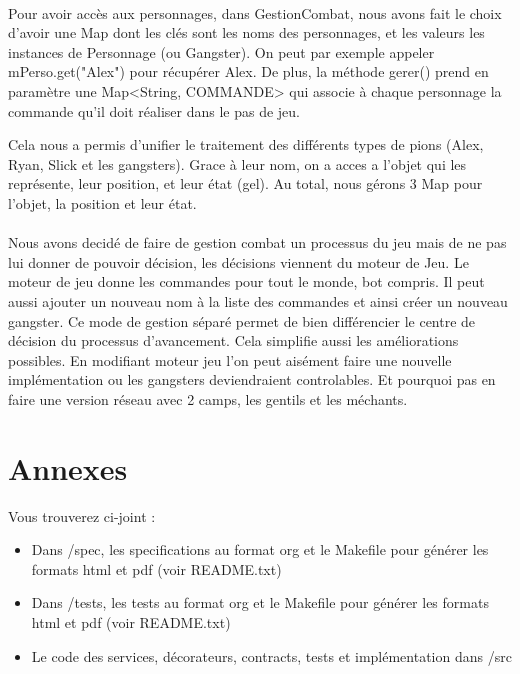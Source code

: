 \documentclass[a4paper,titlepage,openany,12pt]{report}
\begin{document}
\paragraph{}
Pour avoir accès aux personnages, dans GestionCombat, nous avons fait le choix d'avoir une Map dont les
clés sont les noms des personnages, et les valeurs les instances de Personnage (ou Gangster). On peut par 
exemple appeler mPerso.get("Alex") pour récupérer Alex.
De plus, la méthode gerer() prend en paramètre une Map<String, COMMANDE> qui associe à chaque personnage
la commande qu'il doit réaliser dans le pas de jeu.

Cela nous a permis d'unifier le traitement des différents types de
pions (Alex, Ryan, Slick et les gangsters).
Grace à leur nom, on a acces a l'objet qui les représente, leur
position, et leur état (gel).
Au total, nous gérons 3 Map pour l'objet, la position et leur état.

\paragraph{}
Nous avons decidé de faire de gestion combat un processus du jeu mais
de ne pas lui donner de pouvoir décision, les décisions viennent du
moteur de Jeu.
Le moteur de jeu donne les commandes pour tout le monde, bot compris.
Il peut aussi ajouter un nouveau nom à la liste des commandes et ainsi
créer un nouveau gangster.
Ce mode de gestion séparé permet de bien différencier le centre de
décision du processus d'avancement. Cela simplifie aussi les
améliorations possibles.
En modifiant moteur jeu l'on peut aisément faire une nouvelle
implémentation ou les gangsters deviendraient controlables. Et pourquoi
pas en faire une version réseau avec 2 camps, les gentils et les méchants.


\section*{Annexes}

Vous trouverez ci-joint :
\begin{itemize}
\item Dans /spec, les specifications au format org et le Makefile pour générer les formats html et pdf (voir README.txt)
\item Dans /tests, les tests au format org et le Makefile pour générer les formats html et pdf (voir README.txt)
\item Le code des services, décorateurs, contracts, tests et implémentation dans /src
\end{itemize}
\end{document}
